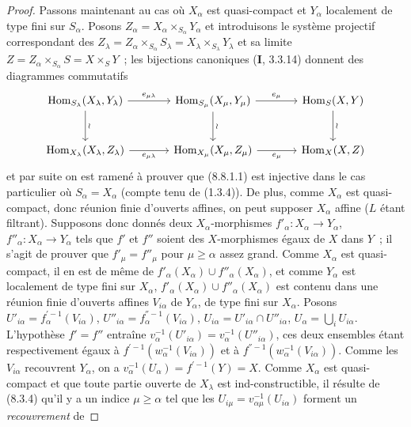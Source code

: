 \begin{proof}
Passons maintenant au cas où $X_\alpha$ est quasi-compact et $Y_\alpha$
localement de type fini sur $S_\alpha$. Posons
$Z_\alpha=X_\alpha\times_{S_\alpha}Y_\alpha$ et introduisons le système
projectif correspondant des
$Z_\lambda=Z_\alpha\times_{S_\alpha}S_\lambda=
X_\lambda\times_{S_\lambda}Y_\lambda$ et sa limite
$Z=Z_\alpha\times_{S_\alpha}S=X\times_S Y$~; les bijections canoniques
(\textbf{I}, 3.3.14) donnent des diagrammes commutatifs
\[
\begin{tikzcd}[column sep=large,row sep=large]
\operatorname{Hom}_{S_\lambda}(X_\lambda,Y_\lambda)
  \ar[r,"e_{\mu\lambda}"] \ar[d,"\wr"] &
\operatorname{Hom}_{S_\mu}(X_\mu,Y_\mu)
  \ar[r,"e_\mu"] \ar[d,"\wr"] &
\operatorname{Hom}_S(X,Y) \ar[d,"\wr"] \\
\operatorname{Hom}_{X_\lambda}(X_\lambda,Z_\lambda)
  \ar[r,"e_{\mu\lambda}"'] &
\operatorname{Hom}_{X_\mu}(X_\mu,Z_\mu)
  \ar[r,"e_\mu"'] &
\operatorname{Hom}_X(X,Z)
\end{tikzcd}
\]
et par suite on est ramené à prouver que (8.8.1.1) est injective dans le cas
particulier où $S_\alpha=X_\alpha$ (compte tenu de (1.3.4)). De plus, comme
$X_\alpha$ est quasi-compact, donc réunion finie d'ouverts affines, on peut
supposer $X_\alpha$ affine ($L$ étant filtrant). Supposons donc donnés deux
$X_\alpha$-morphismes $f'_\alpha:X_\alpha\to Y_\alpha$,
$f''_\alpha:X_\alpha\to Y_\alpha$ tels que $f'$ et $f''$ soient des
$X$-morphismes égaux de $X$ dans $Y$~; il s'agit de prouver que
$f'_\mu=f''_\mu$ pour $\mu\geq\alpha$ assez grand. Comme $X_\alpha$ est
quasi-compact, il en est de même de
$f'_\alpha(X_\alpha)\cup f''_\alpha(X_\alpha)$, et comme $Y_\alpha$ est
localement de type fini sur $X_\alpha$,
$f'_\alpha(X_\alpha)\cup f''_\alpha(X_\alpha)$ est contenu dans une réunion
finie d'ouverts affines $V_{i\alpha}$ de $Y_\alpha$, de type fini sur
$X_\alpha$. Posons
$U'_{i\alpha}=f_\alpha^{'-1}(V_{i\alpha})$,
$U''_{i\alpha}=f_\alpha^{''-1}(V_{i\alpha})$,
$U_{i\alpha}=U'_{i\alpha}\cap U''_{i\alpha}$,
$U_\alpha=\bigcup_iU_{i\alpha}$. L'hypothèse $f'=f''$ entraîne
$v_\alpha^{-1}(U'_{i\alpha})=v_\alpha^{-1}(U''_{i\alpha})$, ces deux ensembles
étant respectivement égaux à $f^{'-1}(w_\alpha^{-1}(V_{i\alpha}))$ et à
$f^{''-1}(w_\alpha^{-1}(V_{i\alpha}))$. Comme les $V_{i\alpha}$ recouvrent
$Y_\alpha$, on a $v_\alpha^{-1}(U_\alpha)=f^{'-1}(Y)=X$. Comme $X_\alpha$
est quasi-compact et que toute partie ouverte de $X_\lambda$ est
ind-constructible, il résulte de (8.3.4) qu'il y a un indice
$\mu\geq\alpha$ tel que les
$U_{i\mu}=v_{\alpha\mu}^{-1}(U_{i\alpha})$ forment un \emph{recouvrement} de

\end{proof}
